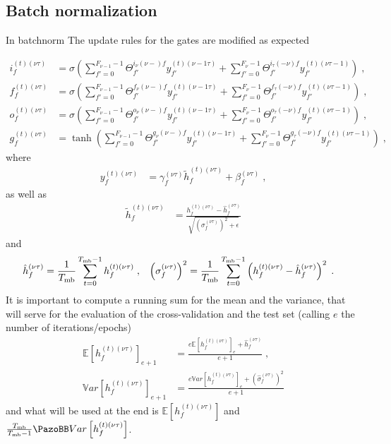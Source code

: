\subsection{Batch normalization}

In batchnorm The update rules for the gates are modified as expected

\begin{align}
i^{(t)(\nu\tau)}_f&=\sigma\left(\sum_{f'=0}^{F_{{\nu-1}}-1}\Theta^{i_\nu(\nu-)f}_{f'}
%
y^{(t)(\nu-1\tau)}_{f'}+\sum_{f'=0}^{F{_{\nu}}-1}\Theta^{i_\tau(-\nu)f}_{f'}
%
y^{(t)(\nu\tau-1)}_{f'}\right)\;,\\
%
f^{(t)(\nu\tau)}_f&=\sigma\left(\sum_{f'=0}^{F{_{\nu-1}}-1}\Theta^{f_\nu(\nu-)f}_{f'}
%
y^{(t)(\nu-1\tau)}_{f'}+\sum_{f'=0}^{F_{{\nu}}-1}\Theta^{f_\tau(-\nu)f}_{f'}
%
y^{(t)(\nu\tau-1)}_{f'}\right)\;,\\
%
o^{(t)(\nu\tau)}_f&=\sigma\left(\sum_{f'=0}^{F_{{\nu-1}}-1}\Theta^{o_\nu(\nu-)f}_{f'}
%
y^{(t)(\nu-1\tau)}_{f'}+\sum_{f'=0}^{F_{{\nu}}-1}\Theta^{o_\tau(-\nu)f}_{f'}
%
y^{(t)(\nu\tau-1)}_{f'}\right)\;,\\
%
g^{(t)(\nu\tau)}_f&=\tanh\left(\sum_{f'=0}^{F_{{\nu-1}}-1}\Theta^{g_\nu(\nu-)f}_{f'}
%
y^{(t)(\nu-1\tau)}_{f'}+\sum_{f'=0}^{F_{{\nu}}-1}\Theta^{g_\tau(-\nu)f}_{f'}
%
y^{(t)(\nu\tau-1)}_{f'}\right)\;,
\end{align}
where
\begin{align}
y^{(t)(\nu\tau)}_{f}&=\gamma^{(\nu\tau)}_{f}\tilde{h}^{(t)(\nu\tau)}_{f}+\beta^{(\nu\tau)}_{f}\;,
\end{align}
as well as
\begin{align}
\tilde{h}^{(t)(\nu\tau)}_{f}&=\frac{h^{(t)(\nu\tau)}_{f}-
%
\hat{h}^{(\nu\tau)}_{f}}{\sqrt{\left(\sigma^{(\nu\tau)}_{f}\right)^2+\epsilon}}
\end{align}
and
\begin{align}
\hat{h}^{(\nu\tau)}_{f}&=\frac{1}{T_{{\rm mb}}}\sum_{t=0}^{T_{{\rm mb}}-1}h^{(t)(\nu\tau)}_{f}\;,&
%
\left(\sigma^{(\nu\tau)}_{f}\right)^2&=\frac{1}{T_{{\rm mb}}}\sum_{t=0}^{T_{{\rm mb}}-1}\left(h^{(t)(\nu\tau)}_{f}
%
-\hat{h}^{(\nu\tau)}_{f}\right)^2\;.
\end{align}
It is important to compute a running sum for the mean and the variance, that will serve for the evaluation of the cross-validation and the test set (calling $e$ the number of iterations/epochs) 
\begin{align}
\mathbb{E}\left[h_{f}^{(t)(\nu\tau)}\right]_{e+1} &=
%
\frac{e\mathbb{E}\left[h_{f}^{(t)(\nu\tau)}\right]_{e}+\hat{h}_{f}^{(\nu\tau)}}{e+1}\;,\\
%
\mathbb{V}ar\left[h_{f}^{(t)(\nu\tau)}\right]_{e+1} &=
%
\frac{e\mathbb{V}ar\left[h_{f}^{(t)(\nu\tau)}\right]_{e}+\left(\hat{\sigma}_{f}^{(\nu\tau)}\right)^2}{e+1}
\end{align}
and what will be used at the end is $\mathbb{E}\left[h_{f}^{(t)(\nu\tau)}\right]$ and $\frac{T_{{\rm mb}}}{T_{{\rm mb}}-1}\mathbb{V}ar\left[h_{f}^{(t)(\nu\tau)}\right]$.



